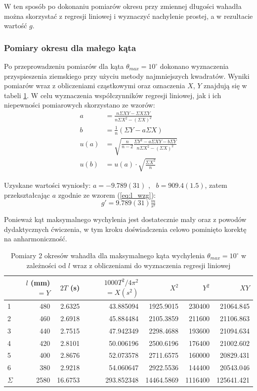 \documentclass[a4paper]{article}
\newlength{\du}
\begin{document}
W ten sposób po dokonaniu pomiarów okresu przy zmiennej długości wahadła można skorzystać z regresji liniowej i wyznaczyć nachylenie prostej, a w rezultacie wartość $g$.

\subsubsection{Pomiary okresu dla małego kąta}

Po przeprowadzeniu pomiarów dla kąta $\theta_{max} = 10^\circ$ dokonano wyznaczenia 
przyspieszenia ziemskiego przy użyciu metody najmniejszych kwadratów. 
Wyniki pomiarów wraz z obliczeniami cząstkowymi oraz oznaczenia $X$, $Y$ znajdują się w tabeli \ref{pomiary_2}.
W celu wyznaczenia współczynników regresji liniowej, jak i ich niepewności pomiarowych skorzystano ze wzorów:
\begin{align*}
a &= \frac{n \Sigma X Y - \Sigma X \Sigma Y}{n \Sigma X^2 - \left(\Sigma X\right)^2} \\
b &= \frac{1}{n}\left(\Sigma Y - a \Sigma X\right) \\
u(a) &= \sqrt{\frac{n}{n-2} \frac{\Sigma Y^2 - a\Sigma XY - b\Sigma Y}{n\Sigma X^2-\left(\Sigma X \right)^2}} \\
u(b) &= u(a)\cdot \sqrt{\frac{\Sigma X^2}{n}}
\end{align*}

Uzyskane wartości wyniosły: $a = -9.789(31)$  , \ $b = 909.4(1.5)$,
zatem przekształcając $a$ zgodnie ze wzorem (\ref{eq:l_wzg}):  \[g' = 9.789(31)  \tfrac{m}{s^2}\]

Ponieważ kąt maksymalnego wychylenia jest dostatecznie mały oraz z powodów dydaktycznych ćwiczenia,
w tym kroku doświadczenia celowo pominięto korektę na anharmoniczność.

\begin{table}[h!]
\centering
	\begin{tabular}{lrrrrrr}
	\toprule
	{} & $l$ (mm) $=Y$ &  $2T$ (s) & \small$1000T^2/4\pi^2$\normalsize$=X (s^2)$ & $X^2$ & $Y^2$ & $XY$ \\
	\midrule
	1 &     480 &  2.6325 &  43.885094 &  1925.9015 &  230400 &  21064.845 \\
	2 &     460 &  2.6918 &  45.884484 &  2105.3859 &  211600 &  21106.863 \\
	3 &     440 &  2.7515 &  47.942349 &  2298.4688 &  193600 &  21094.634 \\
	4 &     420 &  2.8101 &  50.006196 &  2500.6196 &  176400 &  21002.602 \\
	5 &     400 &  2.8676 &  52.073578 &  2711.6575 &  160000 &  20829.431 \\
	6 &     380 &  2.9218 &  54.060647 &  2922.5536 &  144400 &  20543.046 \\
	\midrule
	$\Sigma$ & 2580 & 16.6753 & 293.852348 & 14464.5869 & 1116400 & 125641.421 \\
	\end{tabular}
\caption{Pomiary 2 okresów wahadła dla maksymalnego kąta wychylenia $\theta_{max} = 10^\circ$ w  zależności od $l$ wraz z obliczeniami do wyznaczenia regresji liniowej}
\label{pomiary_2}
\end{table}
\end{document}

